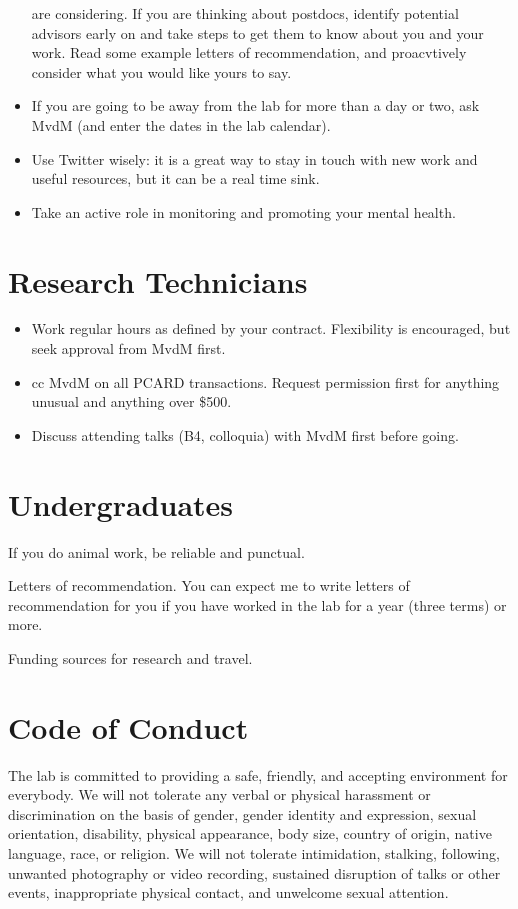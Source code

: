 \documentclass{tufte-book}
\begin{document}
\begin{itemize}
{are considering. If you are thinking about
postdocs, identify potential advisors early on and take steps to get
them to know about you and your work. Read some example letters of
recommendation, and proacvtively consider what you would like yours to say.}
\item{If you are going to be away from the lab for more than a day or two,
ask MvdM (and enter the dates in the lab calendar).}
\item{Use Twitter wisely: it is a great way to stay in touch with new work
and useful resources, but it can be a real time sink.}
\item{Take an active role in monitoring and promoting your mental health.}
\end{itemize}

\section{Research Technicians}

\begin{itemize}
\item{Work regular hours as defined by your contract. Flexibility is
encouraged, but seek approval from MvdM first.}
\item{cc MvdM on all PCARD transactions. Request permission first for
anything unusual and anything over \$500.}
\item{Discuss attending talks (B4, colloquia) with MvdM first before
  going.}
\end{itemize}

\section{Undergraduates}

If you do animal work, be reliable and punctual.

Letters of recommendation. You can expect me to write letters of
recommendation for you if you have worked in the lab for a year (three
terms) or more.

Funding sources for research and travel.

\section{Code of Conduct}

The lab is committed to providing a safe, friendly, and accepting
environment for everybody. We will not tolerate any verbal or physical
harassment or discrimination on the basis of gender, gender identity
and expression, sexual orientation, disability, physical appearance,
body size, country of origin, native language, race, or religion. We
will not tolerate intimidation, stalking, following, unwanted
photography or video recording, sustained disruption of talks or other
events, inappropriate physical contact, and unwelcome sexual
attention. 
\end{document}
